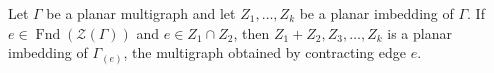 Let $\Gamma$ be a planar multigraph and let $Z_1, \ldots, Z_k$ be a planar imbedding of $\Gamma$. If $e \in \operatorname{Fnd}(\mathcal{Z}(\Gamma))$ and $e \in Z_1 \cap Z_2$, then $Z_1 + Z_2, Z_3, \ldots, Z_k$ is a planar imbedding of $\Gamma_{(e)}$, the multigraph obtained by contracting edge $e$.
